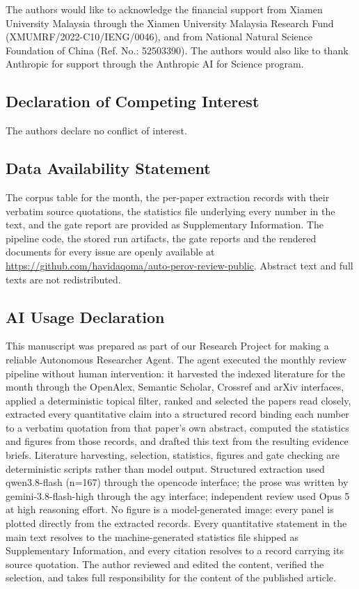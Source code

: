 \documentclass[
  11pt,
]{article}
\begin{document}
The authors would like to acknowledge the financial support from Xiamen
University Malaysia through the Xiamen University Malaysia Research Fund
(XMUMRF/2022-C10/IENG/0046), and from National Natural Science
Foundation of China (Ref. No.: 52503390). The authors would also like to
thank Anthropic for support through the Anthropic AI for Science
program.

\subsection{Declaration of Competing
Interest}\label{declaration-of-competing-interest}

The authors declare no conflict of interest.

\subsection{Data Availability
Statement}\label{data-availability-statement}

The corpus table for the month, the per-paper extraction records with
their verbatim source quotations, the statistics file underlying every
number in the text, and the gate report are provided as Supplementary
Information. The pipeline code, the stored run artifacts, the gate
reports and the rendered documents for every issue are openly available
at \url{https://github.com/havidaqoma/auto-perov-review-public}.
Abstract text and full texts are not redistributed.

\subsection{AI Usage Declaration}\label{ai-usage-declaration}

This manuscript was prepared as part of our Research Project for making
a reliable Autonomous Researcher Agent. The agent executed the monthly
review pipeline without human intervention: it harvested the indexed
literature for the month through the OpenAlex, Semantic Scholar,
Crossref and arXiv interfaces, applied a deterministic topical filter,
ranked and selected the papers read closely, extracted every
quantitative claim into a structured record binding each number to a
verbatim quotation from that paper's own abstract, computed the
statistics and figures from those records, and drafted this text from
the resulting evidence briefs. Literature harvesting, selection,
statistics, figures and gate checking are deterministic scripts rather
than model output. Structured extraction used qwen3.8-flash (n=167)
through the opencode interface; the prose was written by
gemini-3.8-flash-high through the agy interface; independent review used
Opus 5 at high reasoning effort. No figure is a model-generated image:
every panel is plotted directly from the extracted records. Every
quantitative statement in the main text resolves to the
machine-generated statistics file shipped as Supplementary Information,
and every citation resolves to a record carrying its source quotation.
The author reviewed and edited the content, verified the selection, and
takes full responsibility for the content of the published article.
\end{document}
